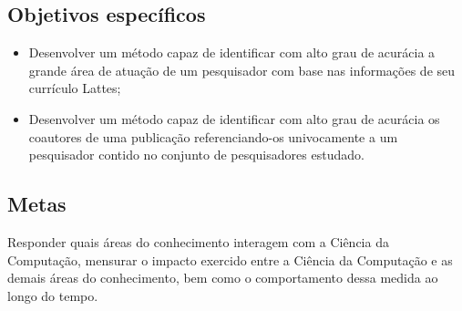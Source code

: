 \subsection{Objetivos específicos}

\begin{itemize}
\item Desenvolver um método capaz de identificar com alto grau de acurácia a grande área de atuação de um pesquisador com base nas informações de seu currículo Lattes;
\item Desenvolver um método capaz de identificar com alto grau de acurácia os coautores de uma publicação referenciando-os univocamente a um pesquisador contido no conjunto de pesquisadores estudado.
\end{itemize}

\subsection{Metas}
Responder quais áreas do conhecimento interagem com a Ciência da Computação, mensurar o impacto exercido entre a Ciência da Computação e as demais áreas do conhecimento, bem como o comportamento dessa medida ao longo do tempo.
